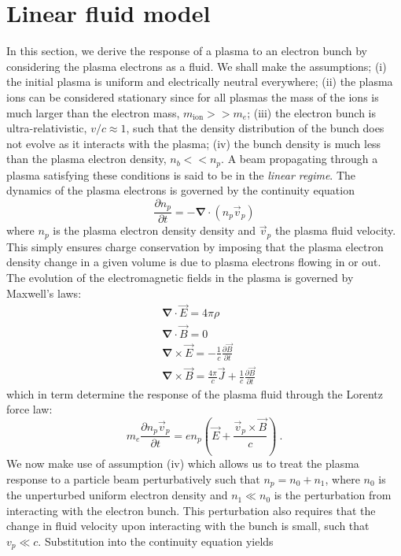 \section{Linear fluid model }
In this section, we derive the response of a plasma to an electron bunch by considering the plasma electrons as a fluid. We shall make the assumptions;  (i) the initial plasma is uniform and electrically neutral everywhere; (ii) the plasma ions can be considered stationary since for all plasmas the mass of the ions is much larger than the electron mass, $m_{\text{ion}}>>m_{e}$; (iii) the electron bunch is ultra-relativistic, $v/c\approx 1$, such that the density distribution of the bunch does not evolve as it interacts with the plasma; (iv) the bunch density is much less than the plasma electron density, $n_b<<n_p$.  A beam propagating through a plasma satisfying these conditions is said to be in the \textit{linear regime}. The dynamics of the plasma electrons is governed by the continuity equation
\begin{equation}
\frac{\partial n_p}{\partial t}=-\mathbf{\nabla}\cdot (n_p\vec{v}_p)
\end{equation}
where $n_p$ is the plasma electron density density and $\vec{v}_p$ the plasma fluid velocity. This simply ensures charge conservation by imposing that the plasma electron density change in a given volume is due to plasma electrons flowing in or out. The evolution of the electromagnetic fields in the plasma is governed by Maxwell's laws:
\begin{align}
\label{Maxwell1}
&\boldsymbol{\nabla}\cdot \vec{E}=4\pi \rho\\
&\boldsymbol{\nabla}\cdot \vec{B}=0\\
&\boldsymbol{\nabla}\times \vec{E}=-\frac{1}{c}\frac{\partial \vec{B}}{\partial t} \\
&\boldsymbol{\nabla}\times \vec{B}=\frac{4\pi}{c}\vec{J}+\frac{1}{c}\frac{\partial \vec{B}}{\partial t}
\label{Maxwell4}
\end{align}
which in term determine the response of the plasma fluid through the Lorentz force law:
\begin{equation}
m_e\frac{\partial n_p\vec{v}_p}{\partial t}=en_p\left(\vec{E}+\frac{\vec{v}_p\times \vec{B}}{c}\right)~.
\end{equation}
We now make use of assumption (iv)
which allows us to treat the plasma response to a particle beam perturbatively such that  $n_p=n_0+n_1$, where $n_0$ is the unperturbed uniform electron density and $n_1\ll n_0$ is the perturbation from interacting with the electron bunch. This perturbation also requires that the change in fluid velocity upon interacting with the bunch is small, such that $v_p\ll c$. Substitution into the continuity equation yields 

